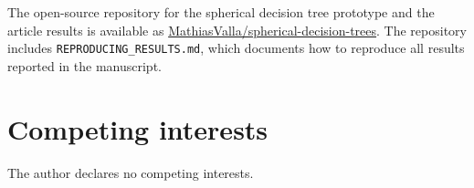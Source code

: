 \documentclass[12pt]{article}
\begin{document}
The open-source repository for the spherical decision tree prototype and the
article results is available as
\href{https://github.com/MathiasValla/spherical-decision-trees}{MathiasValla/spherical-decision-trees}.
The repository includes \texttt{REPRODUCING\_RESULTS.md}, which documents how to
reproduce all results reported in the manuscript.

\section*{Competing interests}

The author declares no competing interests.
\end{document}
